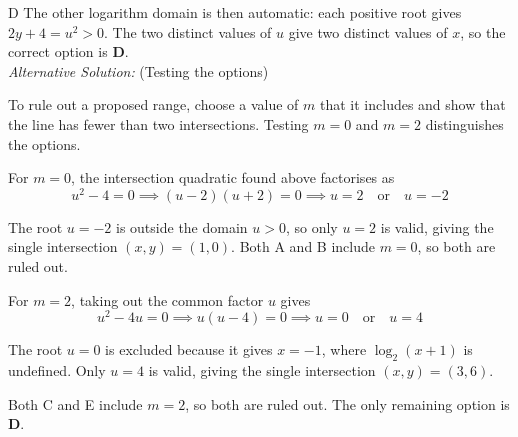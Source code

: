 \documentclass[11pt,a4paper]{article}
\begin{document}
\begin{enumerate}[label=\textbf{\arabic*.},leftmargin=*,itemsep=0pt,start=19]
\begin{djsSolution}{D}
The other logarithm domain is then automatic: each positive root gives $2y+4=u^2>0$. The two distinct values of $u$ give two distinct values of $x$, so the correct option is \textbf{D}.\\[5pt]

\textit{Alternative Solution:} (Testing the options)

To rule out a proposed range, choose a value of $m$ that it includes and show that the line has fewer than two intersections. Testing $m=0$ and $m=2$ distinguishes the options.

For $m=0$, the intersection quadratic found above factorises as
\[
u^2-4=0
\implies (u-2)(u+2)=0
\implies u=2\quad\text{or}\quad u=-2
\]

The root $u=-2$ is outside the domain $u>0$, so only $u=2$ is valid, giving the single intersection $(x,y)=(1,0)$. Both A and B include $m=0$, so both are ruled out.

For $m=2$, taking out the common factor $u$ gives
\[
u^2-4u=0
\implies u(u-4)=0
\implies u=0\quad\text{or}\quad u=4
\]

The root $u=0$ is excluded because it gives $x=-1$, where $\log_2(x+1)$ is undefined. Only $u=4$ is valid, giving the single intersection $(x,y)=(3,6)$.

Both C and E include $m=2$, so both are ruled out. The only remaining option is \textbf{D}.
\end{djsSolution}
\end{enumerate}
\clearpage
\thispagestyle{djssolutions}
\vspace*{8pt}
\end{document}
